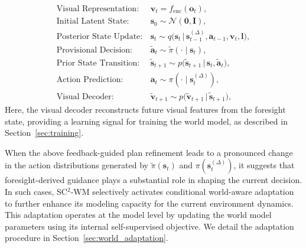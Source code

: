 \documentclass{article}
\theoremstyle{plain}
\theoremstyle{definition}
\theoremstyle{remark}
\begin{document}
\begin{align}
    \text{Visual Representation:}& \,\boldsymbol{v}_t = f_{\mathrm{enc}}(\boldsymbol{o}_t),\\
    \text{Initial Latent State:}& \,\boldsymbol{s}_0 \sim \mathcal{N}(\mathbf{0}, \mathbf{I}),\\
    \text{Posterior State Update:}& \,\boldsymbol{s}_{t} \sim q\big(\boldsymbol{s}_{t}\,|\,\boldsymbol{s}_{t-1}^{(\Delta)}, \boldsymbol{a}_{t-1}, \boldsymbol{v}_{t}, \boldsymbol{l}\big),\label{Eq:po}\\
    \text{Provisional Decision:}& \,\tilde{\boldsymbol{a}}_t \sim \tilde{\pi}(\cdot \mid \boldsymbol{s}_t), \\
    \text{Prior State Transition:}& \,\boldsymbol{\tilde{s}}_{t+1} \sim p\big(\boldsymbol{\tilde{s}}_{t+1}\,|\,\boldsymbol{s}_{t}, \tilde{\boldsymbol{a}}_t\big),\label{Eq:p}\\
    \text{Action Prediction:}& \,\boldsymbol{a}_t \sim \pi(\cdot \mid \boldsymbol{s}_t^{(\Delta)}),\label{Eq:ap}\\
    \text{Visual Decoder:}& \,\boldsymbol{\tilde{v}}_{t+1} \sim p\big(\boldsymbol{\tilde{v}}_{t+1}\,|\,\boldsymbol{\tilde{s}}_{t+1}\big)\label{Eq:v},
\end{align}
Here, the visual decoder reconstructs future visual features from the foresight state, providing a learning signal for training the world model, as described in Section~\ref{sec:training}.



When the above feedback-guided plan refinement leads to a pronounced change in the action distributions generated by $\tilde{\pi}(\boldsymbol{s}_t)$ and $\pi(\boldsymbol{s}_t^{(\Delta)})$, it suggests that foresight-derived guidance plays a substantial role in shaping the current decision.
In such cases, SC$^{2}$-WM selectively activates conditional world-aware adaptation to further enhance its modeling capacity for the current environment dynamics.
This adaptation operates at the model level by updating the world model parameters using its internal self-supervised objective.
We detail the adaptation procedure in Section~\ref{sec:world_adaptation}. %
\end{document}
